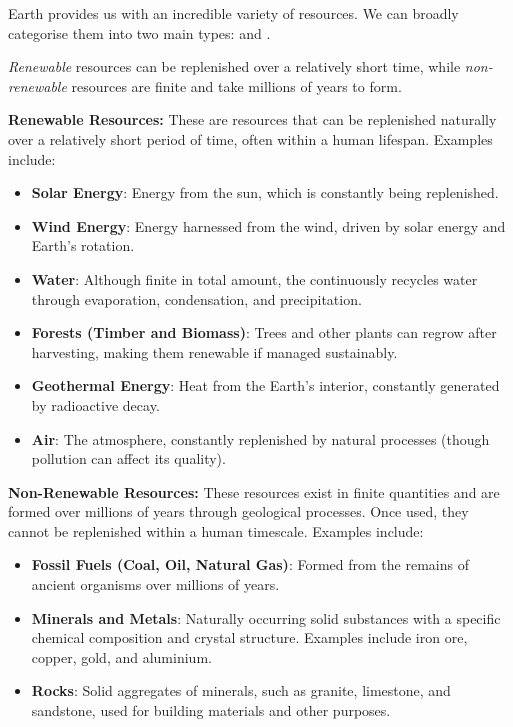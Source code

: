 Earth provides us with an incredible variety of resources. We can broadly categorise them into two main types:  and .

\begin{marginnote}
\textit{Renewable} resources can be replenished over a relatively short time, while \textit{non-renewable} resources are finite and take millions of years to form.
\end{marginnote}

\textbf{Renewable Resources:} These are resources that can be replenished naturally over a relatively short period of time, often within a human lifespan. Examples include:

\begin{itemize}
    \item \textbf{Solar Energy}:  Energy from the sun, which is constantly being replenished.
    \item \textbf{Wind Energy}:  Energy harnessed from the wind, driven by solar energy and Earth's rotation.
    \item \textbf{Water}:  Although finite in total amount, the  continuously recycles water through evaporation, condensation, and precipitation.
    \item \textbf{Forests (Timber and Biomass)}: Trees and other plants can regrow after harvesting, making them renewable if managed sustainably.
    \item \textbf{Geothermal Energy}: Heat from the Earth's interior, constantly generated by radioactive decay.
    \item \textbf{Air}: The atmosphere, constantly replenished by natural processes (though pollution can affect its quality).
\end{itemize}

\textbf{Non-Renewable Resources:} These resources exist in finite quantities and are formed over millions of years through geological processes. Once used, they cannot be replenished within a human timescale. Examples include:

\begin{itemize}
    \item \textbf{Fossil Fuels (Coal, Oil, Natural Gas)}: Formed from the remains of ancient organisms over millions of years.
    \item \textbf{Minerals and Metals}:  Naturally occurring solid substances with a specific chemical composition and crystal structure. Examples include iron ore, copper, gold, and aluminium.
    \item \textbf{Rocks}: Solid aggregates of minerals, such as granite, limestone, and sandstone, used for building materials and other purposes.
\end{itemize}

